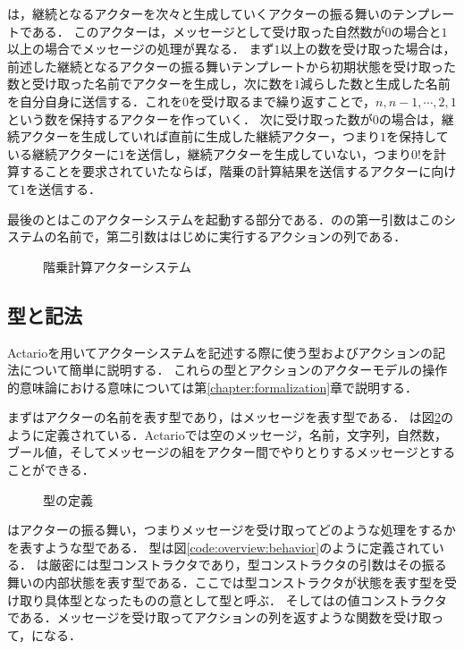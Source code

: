 は，継続となるアクターを次々と生成していくアクターの振る舞いのテンプレートである．
このアクターは，メッセージとして受け取った自然数が$0$の場合と$1$以上の場合でメッセージの処理が異なる．
まず$1$以上の数を受け取った場合は，前述した継続となるアクターの振る舞いテンプレートから初期状態を受け取った数と受け取った名前でアクターを生成し，次に数を$1$減らした数と生成した名前を自分自身に送信する．これを$0$を受け取るまで繰り返すことで，$n, n - 1, \cdots, 2, 1$ という数を保持するアクターを作っていく．
次に受け取った数が$0$の場合は，継続アクターを生成していれば直前に生成した継続アクター，つまり$1$を保持している継続アクターに$1$を送信し，継続アクターを生成していない，つまり$0!$を計算することを要求されていたならば，階乗の計算結果を送信するアクターに向けて$1$を送信する．

最後のとはこのアクターシステムを起動する部分である．のの第一引数はこのシステムの名前で，第二引数ははじめに実行するアクションの列である．

\begin{figure}[tp]
  
  \caption{階乗計算アクターシステム}\label{code:overview:fact-impl}
\end{figure}

\subsection{型と記法}

Actarioを用いてアクターシステムを記述する際に使う型およびアクションの記法について簡単に説明する．
これらの型とアクションのアクターモデルの操作的意味論における意味については第\ref{chapter:formalization}章で説明する．

まずはアクターの名前を表す型であり，はメッセージを表す型である．
は図\ref{code:overview:message}のように定義されている．Actarioでは空のメッセージ，名前，文字列，自然数，ブール値，そしてメッセージの組をアクター間でやりとりするメッセージとすることができる．

\begin{figure}
  
  \caption{型の定義}\label{code:overview:message}
\end{figure}

はアクターの振る舞い，つまりメッセージを受け取ってどのような処理をするかを表すような型である．
型は図\ref{code:overview:behavior}のように定義されている．
は厳密には型コンストラクタであり，型コンストラクタの引数はその振る舞いの内部状態を表す型である．ここでは型コンストラクタが状態を表す型を受け取り具体型となったものの意として型と呼ぶ．
そしてはの値コンストラクタである．メッセージを受け取ってアクションの列を返すような関数を受け取って，になる．

